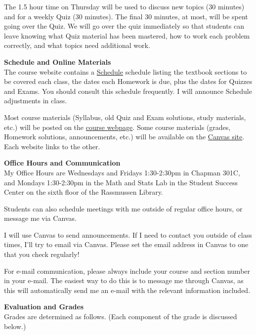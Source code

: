 \documentclass[12pt]{article}
\renewcommand{\emph}[1]{\textsf{\textbf{#1}}}
\newcommand{\localhead}[1]{\par\smallskip\textbf{#1} \smallskip\nobreak\\}%
\def\heading#1{\localhead{\large\emph{#1}}}
\begin{document}
The 1.5 hour time on Thursday will be used to discuss new topics (30
minutes) and for a weekly Quiz (30 minutes).  The final 30 minutes, at
most, will be spent going over the Quiz.  We will go over the quiz
immediately so that students can leave knowing what Quiz material has
been mastered, how to work each problem correctly, and what topics
need additional work.


\clearpage\newpage

\strut

\vspace{-12pt}

\heading{Schedule and Online Materials}
The course website contains a
\href{https://uaf-math251.github.io/calc2/assets/general/S25/meek/schedule.pdf}{Schedule}
schedule
listing the textbook sections to be covered each class, the dates each
Homework is due, plus the dates for Quizzes and Exams. You should
consult this schedule frequently.  I will announce Schedule
adjustments in class.

Most course materials (Syllabus, old Quiz and Exam solutions, study materials, etc.) will be posted on the \href{https://uaf-math251.github.io/calc2/}{course webpage}.  Some course materials (grades, Homework solutions, announcements, etc.) will be available on the \href{https://canvas.alaska.edu/courses/24107}{Canvas site}.  Each website links to the other.


\heading{Office Hours and Communication}
My Office Hours are Wednesdays and Fridays 1:30-2:30pm in Chapman 301C, and
Mondays 1:30-2:30pm in the Math and Stats Lab in the Student
Success Center on the sixth floor of the Rassmussen Library.

Students can also schedule meetings with me outside of regular office
hours, or message me via Canvas.


I will use Canvas to send announcements.  If I need to contact you
outside of class times, I'll try to email via Canvas.  Please set the
email address in Canvas to one that you check regularly!

For e-mail communication, please always include your course and
section number in your e-mail. The easiest way to do this is to
message me through Canvas, as this will automatically send me an
e-mail with the relevant information included.


\heading{Evaluation and Grades}
Grades are determined as follows.  (Each component of the grade is discussed below.)
 
\end{document}
